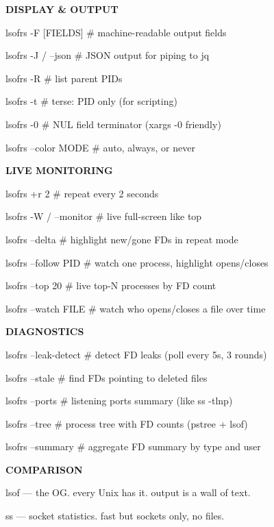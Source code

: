 \documentclass[11pt,a4paper,twoside]{book}
\begin{document}
\vspace{12pt}
{\bfseries\color{neonyellow} DISPLAY \& OUTPUT}\vspace{4pt}

lsofrs -F [FIELDS]  \# machine-readable output fields

lsofrs -J / --json  \# JSON output for piping to jq

lsofrs -R           \# list parent PIDs

lsofrs -t           \# terse: PID only (for scripting)

lsofrs -0           \# NUL field terminator (xargs -0 friendly)

lsofrs --color MODE \# auto, always, or never


\vspace{12pt}
{\bfseries\color{neonyellow} LIVE MONITORING}\vspace{4pt}

lsofrs +r 2         \# repeat every 2 seconds

lsofrs -W / --monitor \# live full-screen like top

lsofrs --delta       \# highlight new/gone FDs in repeat mode

lsofrs --follow PID  \# watch one process, highlight opens/closes

lsofrs --top 20     \# live top-N processes by FD count

lsofrs --watch FILE  \# watch who opens/closes a file over time


\vspace{12pt}
{\bfseries\color{neonyellow} DIAGNOSTICS}\vspace{4pt}

lsofrs --leak-detect \# detect FD leaks (poll every 5s, 3 rounds)

lsofrs --stale       \# find FDs pointing to deleted files

lsofrs --ports       \# listening ports summary (like ss -tlnp)

lsofrs --tree        \# process tree with FD counts (pstree + lsof)

lsofrs --summary     \# aggregate FD summary by type and user


\vspace{12pt}
{\bfseries\color{neonyellow} COMPARISON}\vspace{4pt}

lsof    — the OG. every Unix has it. output is a wall of text.

ss      — socket statistics. fast but sockets only, no files.
\end{document}

